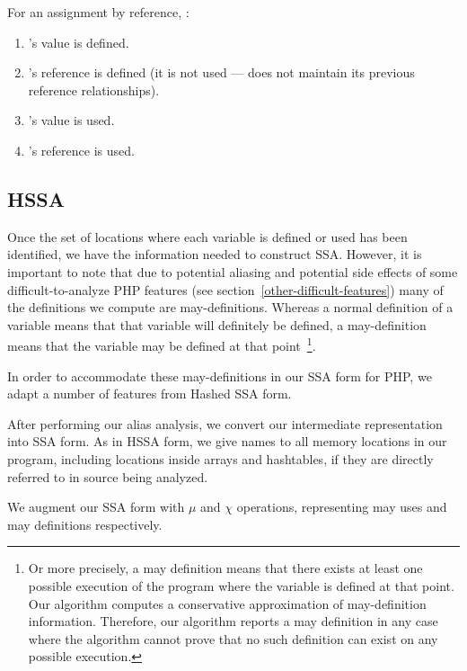 For an assignment by reference, :

\begin{enumerate}
	\item
		's value is defined.
	\item
		's reference is defined (it is not
                used ---  does not maintain its previous
                reference relationships).

	\item
		's value is used.

	\item
		's reference is used.

\end{enumerate}



\subsection{HSSA}

Once the set of locations where each variable is defined or used has
been identified, we have the information needed to construct SSA.
However, it is important to note that due to potential aliasing and
potential side effects of some difficult-to-analyze PHP features (see
section~\ref{other-difficult-features}) many of the definitions we
compute are may-definitions. Whereas a normal definition of a variable
means that that variable will definitely be defined, a may-definition
means that the variable may be defined at that point~\footnote{Or more
  precisely, a may definition means that there exists at least one
  possible execution of the program where the variable is defined at
  that point. Our algorithm computes a conservative approximation of
  may-definition information. Therefore, our algorithm reports a may
  definition in any case where the algorithm cannot prove that no such
  definition can exist on any possible execution.}.

In order to accommodate these may-definitions in our SSA form for PHP,
we adapt a number of features from Hashed SSA form.

After performing our alias analysis, we convert our intermediate
representation into SSA form. As in HSSA form, we give names to all
memory locations in our program, including locations inside arrays and
hashtables, if they are directly referred to in source being analyzed.

We augment our SSA form with $\mu$ and $\chi$ operations, representing
may uses and may definitions respectively.

